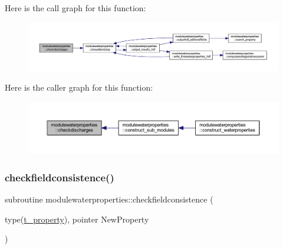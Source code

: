 Here is the call graph for this function\+:\nopagebreak
\begin{figure}[H]
\begin{center}
\leavevmode
\includegraphics[width=350pt]{namespacemodulewaterproperties_a3d45e3e4c8782ebce340659d7f000fbb_cgraph}
\end{center}
\end{figure}
Here is the caller graph for this function\+:\nopagebreak
\begin{figure}[H]
\begin{center}
\leavevmode
\includegraphics[width=350pt]{namespacemodulewaterproperties_a3d45e3e4c8782ebce340659d7f000fbb_icgraph}
\end{center}
\end{figure}
\mbox{\label{namespacemodulewaterproperties_ae1f665f653d3f72ef388bbb889ec57c9}} 
\subsubsection{\texorpdfstring{checkfieldconsistence()}{checkfieldconsistence()}}
{\footnotesize\ttfamily subroutine modulewaterproperties\+::checkfieldconsistence (\begin{DoxyParamCaption}\item[{type(\mbox{\hyperlink{structmodulewaterproperties_1_1t__property}{t\+\_\+property}}), pointer}]{New\+Property }\end{DoxyParamCaption})\hspace{0.3cm}{\ttfamily [private]}}

